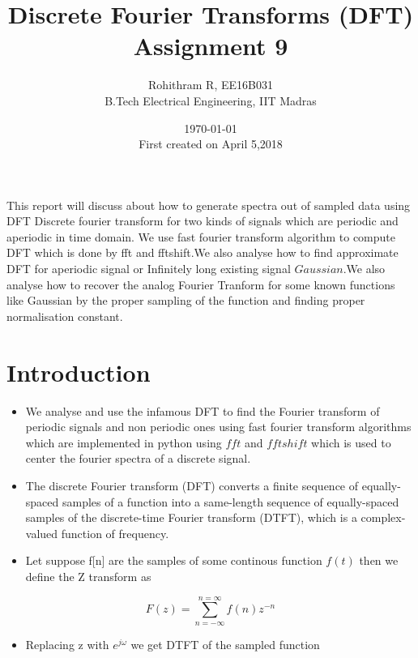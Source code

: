 \documentclass[11pt]{article}
\title{Discrete Fourier Transforms (DFT) \\ Assignment 9}
\author{Rohithram R, EE16B031 \\ B.Tech Electrical Engineering, IIT Madras}
\date{\today \\ First created on April 5,2018}
\providecommand{\tightlist}{%
      \setlength{\itemsep}{0pt}\setlength{\parskip}{0pt}}
\begin{document}
    
    
    \maketitle
    
    

    
\begin{abstract}
\end{abstract}
 This report will discuss about how to generate spectra out of sampled
data using DFT Discrete fourier transform for two kinds of signals which
are periodic and aperiodic in time domain. We use fast fourier transform
algorithm to compute DFT which is done by fft and fftshift.We also
analyse how to find approximate DFT for aperiodic signal or Infinitely
long existing signal \(Gaussian\).We also analyse how to recover the
analog Fourier Tranform for some known functions like Gaussian by the
proper sampling of the function and finding proper normalisation
constant.

    \section{Introduction}\label{introduction}

\begin{itemize}
\tightlist
\item
  We analyse and use the infamous DFT to find the Fourier transform of
  periodic signals and non periodic ones using fast fourier transform
  algorithms which are implemented in python using \(fft\) and
  \(fftshift\) which is used to center the fourier spectra of a discrete
  signal.
\item
  The discrete Fourier transform (DFT) converts a finite sequence of
  equally-spaced samples of a function into a same-length sequence of
  equally-spaced samples of the discrete-time Fourier transform (DTFT),
  which is a complex-valued function of frequency.
\item
  Let suppose f{[}n{]} are the samples of some continous function
  \(f(t)\) then we define the Z transform as
\end{itemize}

\begin{equation}
F(z) = \sum_{n = -\infty}^{n = \infty} f(n)z^{-n}
\end{equation}

\begin{itemize}
\tightlist
\item
  Replacing z with \(e^{j\omega}\) we get DTFT of the sampled function
\end{itemize}
\end{document}
